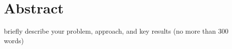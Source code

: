 \chapter{Abstract}
briefly describe your problem, approach, and key results (no more than 300 words) 
